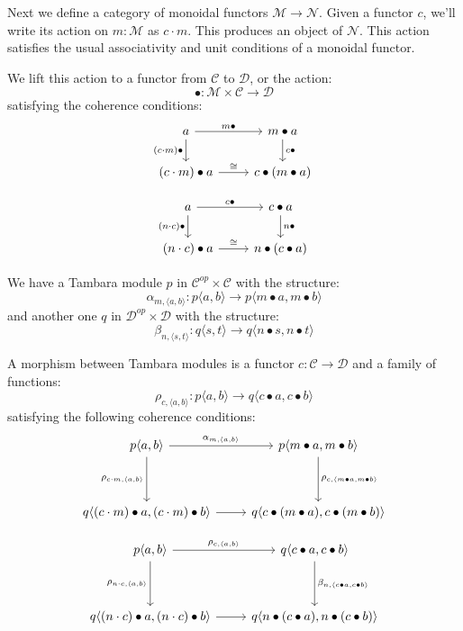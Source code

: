 \documentclass[11pt]{amsart}
\newcommand{\cat}[1]{\mathcal{#1}}%
\begin{document}
Next we define a category of monoidal functors $\cat M \to \cat N$. Given a functor $c$, we'll write its action on $m \colon \cat M$ as $c \cdot m$. This produces an object of $\cat N$. This action satisfies the usual associativity and unit conditions of a monoidal functor. 

We lift this action to a functor from $\cat C$ to  $\cat D$, or the action:
\[ \bullet \colon \cat M \times \cat C \to \cat D \]
satisfying the coherence conditions:
\[
 \begin{tikzcd}
 a
 \arrow [r, "m \bullet"] 
 \arrow [d, "(c \cdot m) \bullet"']
 & m \bullet a
 \arrow [d, "c \bullet"]
 \\
 (c \cdot m) \bullet a
 \arrow [r, "\cong"]
 & c \bullet (m \bullet a)
 \end{tikzcd}
\]

\[
 \begin{tikzcd}
 a
 \arrow [r, "c \bullet"] 
 \arrow [d, "(n \cdot c) \bullet"']
 & c \bullet a
 \arrow [d, "n \bullet"]
 \\
 (n \cdot c) \bullet a
 \arrow [r, "\cong"]
 & n \bullet (c \bullet a)
 \end{tikzcd}
\]


We have a Tambara module $p$ in $\cat C^{op} \times \cat C$ with the structure:
\[ \alpha_{m, \langle a, b \rangle} \colon p \langle a, b \rangle \to p \langle m \bullet a, m \bullet b \rangle \]
and another one $q$ in $\cat D^{op} \times \cat D$  with the structure:
\[ \beta_{n, \langle s, t \rangle} \colon q \langle s, t \rangle \to q \langle n \bullet s, n \bullet t \rangle \]

A morphism between Tambara modules is a functor $c \colon \cat C \to \cat D$ and a family of functions:
\[ \rho_{c, \langle a, b \rangle} \colon p \langle a, b \rangle \to q \langle c \bullet a, c \bullet b \rangle \]
satisfying the following coherence conditions:
\[
 \begin{tikzcd}
 p \langle a, b \rangle
 \arrow[r, "{\alpha_{m, \langle a, b \rangle}}"]
 \arrow[dd, "{\rho_{c \cdot m, \langle a, b \rangle}}"']
& p \langle m \bullet a, m \bullet b \rangle
 \arrow[dd, "{\rho_{c, \langle m \bullet a, m \bullet b \rangle}}"]
 \\
  \\
 q \langle (c \cdot m)  \bullet a, (c \cdot m) \bullet b \rangle
 \arrow[r, ""]
& q \langle c \bullet (m \bullet a), c \bullet (m \bullet b) \rangle
 \end{tikzcd}
\]

\[
 \begin{tikzcd}
 p \langle a, b \rangle
 \arrow[r, "{\rho_{c, \langle a, b \rangle}}"]
 \arrow[dd, "{\rho_{n \cdot c, \langle a, b \rangle}}"']
& q \langle c \bullet a, c \bullet b \rangle
 \arrow[dd, "{\beta_{n, \langle c \bullet a, c \bullet b \rangle}}"]
 \\
  \\
 q \langle (n \cdot c)  \bullet a, (n \cdot c) \bullet b \rangle
 \arrow[r, ""]
& q \langle n \bullet (c \bullet a), n \bullet (c \bullet b) \rangle
 \end{tikzcd}
\]
\end{document}
